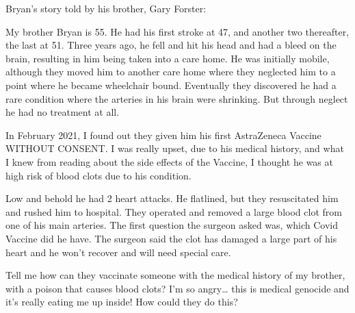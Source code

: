 Bryan’s story told by his brother, Gary Forster:

My brother Bryan is 55. He had his first stroke at 47, and another two
thereafter, the last at 51. Three years ago, he fell and hit his head and had a
bleed on the brain, resulting in him being taken into a care home. He was
initially mobile, although they moved him to another care home where they
neglected him to a point where he became wheelchair bound. Eventually they
discovered he had a rare condition where the arteries in his brain were
shrinking. But through neglect he had no treatment at all.

In February 2021, I found out they given him his first AstraZeneca Vaccine
WITHOUT CONSENT. I was really upset, due to his medical history, and what I knew
from reading about the side effects of the Vaccine, I thought he was at high
risk of blood clots due to his condition.

Low and behold he had 2 heart attacks. He flatlined, but they resuscitated him
and rushed him to hospital. They operated and removed a large blood clot from
one of his main arteries. The first question the surgeon asked was, which Covid
Vaccine did he have. The surgeon said the clot has damaged a large part of his
heart and he won’t recover and will need special care.

Tell me how can they vaccinate someone with the medical history of my brother,
with a poison that causes blood clots? I’m so angry… this is medical genocide
and it’s really eating me up inside! How could they do this?

